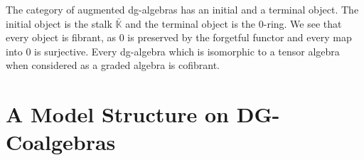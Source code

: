 \documentclass[../thesis.tex]{subfiles}
\begin{document}
            The category of augmented dg-algebras has an initial and a terminal object. The initial object is the stalk $\bar{\mathbb{K}}$ and the terminal object is the $0$-ring. We see that every object is fibrant, as $0$ is preserved by the forgetful functor and every map into $0$ is surjective. Every dg-algebra which is isomorphic to a tensor algebra when considered as a graded algebra is cofibrant.
            
    \section{A Model Structure on DG-Coalgebras}
\end{document}
